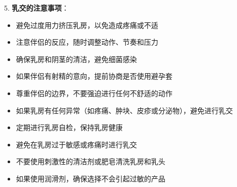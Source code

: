 \documentclass[12pt,UTF8]{ctexbook}
\begin{document}
5. \textbf{乳交的注意事项}：
\begin{itemize}
	\item 避免过度用力挤压乳房，以免造成疼痛或不适
	\item 注意伴侣的反应，随时调整动作、节奏和压力
	\item 确保乳房和阴茎的清洁，避免细菌感染
	\item 如果伴侣有射精的意向，提前协商是否使用避孕套
	\item 尊重伴侣的边界，不要强迫进行任何不舒适的动作
	\item 如果乳房有任何异常（如疼痛、肿块、皮疹或分泌物），避免进行乳交
	\item 定期进行乳房自检，保持乳房健康
	\item 避免在乳房过于敏感或疼痛时进行乳交
	\item 不要使用刺激性的清洁剂或肥皂清洗乳房和乳头
	\item 如果使用润滑剂，确保选择不会引起过敏的产品
\end{itemize}
\end{document}
